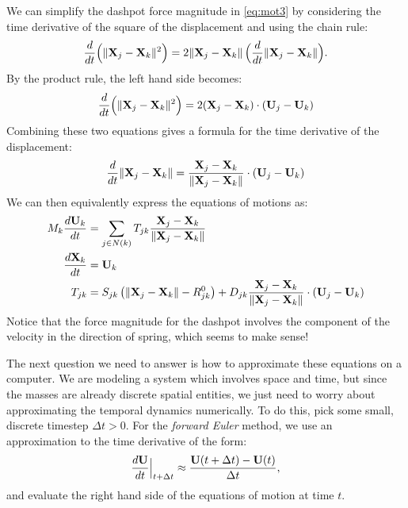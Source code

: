 \documentclass[10pt]{article}
\begin{document}
We can simplify the dashpot force magnitude in \eqref{eq:mot3} by considering the time derivative of the square of the displacement and using the chain rule:
\begin{align*}
\frac{d}{dt} \Big(\|{\bf X}_j - {\bf X}_k\|^2\Big) = 2 \|{\bf X}_j - {\bf X}_k\| \, \Big( \frac{d}{dt} \|{\bf X}_j - {\bf X}_k \| \Big).
\end{align*}  
By the product rule, the left hand side becomes:
\begin{align*}
\frac{d}{dt} \Big(\|{\bf X}_j - {\bf X}_k\|^2\Big) = 2({\bf X}_j - {\bf X}_k) \cdot ({\bf U}_j - {\bf U}_k)
\end{align*}
Combining these two equations gives a formula for the time derivative of the displacement:
\begin{align*}
\frac{d}{dt} \|{\bf X}_j - {\bf X}_k \| = \frac{{\bf X}_j - {\bf X}_k}{\|{\bf X}_j - {\bf X}_k\|} \cdot ({\bf U}_j - {\bf U}_k)
\end{align*}
We can then equivalently express the equations of motions as: 
\begin{align}
\label{eq:mot1}
M_k \frac{d {\bf U}_k}{dt} &= \sum_{j \in N(k)} T_{jk} \frac{{\bf X}_j - {\bf X}_k}{\| {\bf X}_j - {\bf X}_k \|} \\
\label{eq:mot2}
\frac{d {\bf X}_k}{dt} &= {\bf U}_k \\
\label{eq:mot3}
T_{jk} &= S_{jk} \left( \|{\bf X}_j - {\bf X}_k\| - R^0_{jk} \right) + D_{jk} \frac{{\bf X}_j - {\bf X}_k}{\|{\bf X}_j - {\bf X}_k\|} \cdot ({\bf U}_j - {\bf U}_k)
\end{align}
Notice that the force magnitude for the dashpot involves the component of the velocity in the direction of spring, which seems to make sense!

The next question we need to answer is how to approximate these equations on a computer.  We are modeling a system which involves space and time, but since the masses are already discrete spatial entities, we just need to worry about approximating the temporal dynamics numerically.  To do this, pick some small, discrete timestep $\Delta t > 0$.  For the {\em forward Euler} method, we use an approximation to the time derivative of the form:
\begin{align*}
\frac{d {\bf U}}{dt}\Big|_{t + \Delta t} \approx \frac{{\bf U}(t+\Delta t ) - {\bf U}(t)}{\Delta t},
\end{align*}
and evaluate the right hand side of the equations of motion at time $t$.
\end{document}

